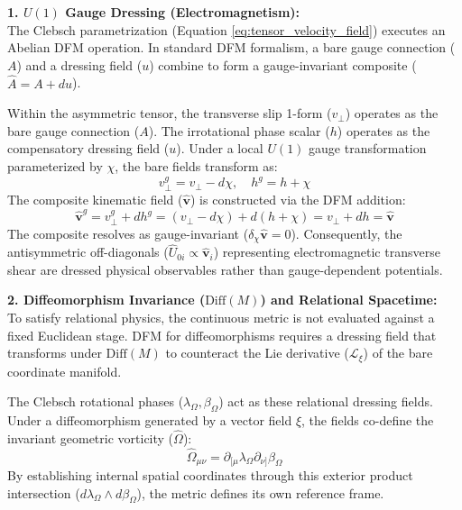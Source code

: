 \textbf{1. $U(1)$ Gauge Dressing (Electromagnetism):} \\
The Clebsch parametrization (Equation \ref{eq:tensor_velocity_field}) executes an Abelian DFM operation. 
In standard DFM formalism, a bare gauge connection ($A$) and a dressing field ($u$) combine to form a gauge-invariant composite ($\hat{A} = A + du$).



Within the asymmetric tensor, the transverse slip 1-form ($v_{\perp}$) operates as the bare gauge connection ($A$). The irrotational phase scalar ($h$) operates as the compensatory dressing field ($u$). Under a local $U(1)$ gauge transformation parameterized by $\chi$, the bare fields transform as: 
\begin{equation}
    v_{\perp}^g = v_{\perp} - d\chi, \quad h^g = h + \chi
\end{equation}
The composite kinematic field ($\mathbf{\hat{v}}$) is constructed via the DFM addition:
\begin{equation}
    \mathbf{\hat{v}}^g = v_{\perp}^g + d h^g = (v_{\perp} - d\chi) + d(h + \chi) = v_{\perp} + dh = \mathbf{\hat{v}}
\end{equation}
The composite resolves as gauge-invariant ($\delta_\chi \mathbf{\hat{v}} = 0$). 
Consequently, the antisymmetric off-diagonals ($\hat{U}_{0i} \propto \mathbf{\hat{v}}_i$) representing electromagnetic transverse shear are dressed physical observables rather than gauge-dependent potentials. 


\textbf{2. Diffeomorphism Invariance ($\text{Diff}(M)$) and Relational Spacetime:} \\
To satisfy relational physics, the continuous metric is not evaluated against a fixed Euclidean stage. DFM for diffeomorphisms requires a dressing field that transforms under $\text{Diff}(M)$ to counteract the Lie derivative ($\mathcal{L}_\xi$) of the bare coordinate manifold. 

The Clebsch rotational phases ($\lambda_\Omega, \beta_\Omega$) act as these relational dressing fields. Under a diffeomorphism generated by a vector field $\xi$, the fields co-define the invariant geometric vorticity ($\hat{\Omega}$):
\begin{equation}
    \hat{\Omega}_{\mu\nu} = \partial_{[\mu} \lambda_\Omega \partial_{\nu]} \beta_\Omega
\end{equation}
By establishing internal spatial coordinates through this exterior product intersection ($d \lambda_\Omega \wedge d \beta_\Omega$), the metric defines its own reference frame. 

